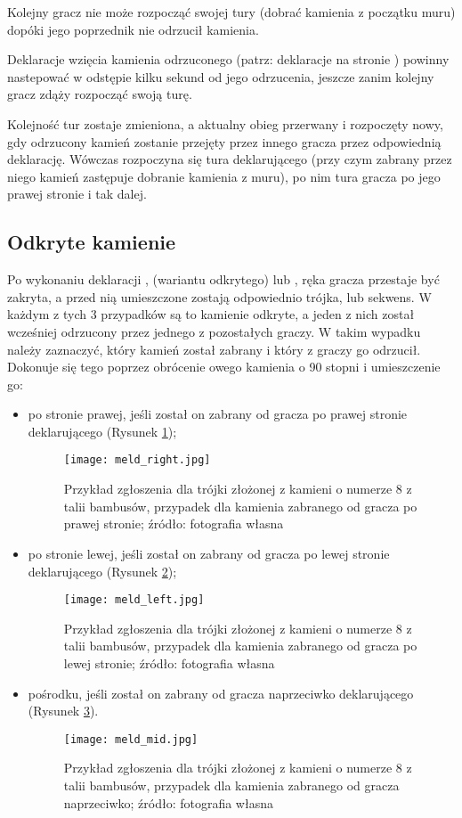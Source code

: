 Kolejny gracz nie może rozpocząć swojej tury (dobrać kamienia z początku muru)
dopóki jego poprzednik nie odrzucił kamienia. 

Deklaracje wzięcia kamienia odrzuconego (patrz: deklaracje na stronie
\pageref{deklaracje}) powinny nastepować w odstępie kilku sekund od jego
odrzucenia, jeszcze zanim kolejny gracz zdąży rozpocząć swoją turę.

Kolejność tur zostaje zmieniona, a aktualny obieg przerwany i rozpoczęty nowy,
gdy odrzucony kamień zostanie przejęty przez innego gracza przez odpowiednią deklarację.
Wówczas rozpoczyna się tura deklarującego (przy czym zabrany przez niego kamień
zastępuje dobranie kamienia z muru), po nim tura gracza po jego prawej stronie i
tak dalej.

\subsection{Odkryte kamienie}
Po wykonaniu deklaracji ,  (wariantu odkrytego) lub
, ręka gracza przestaje być zakryta, a przed nią
umieszczone zostają  odpowiednio trójka,  lub sekwens. W każdym z
tych 3 przypadków są to kamienie odkryte, a jeden z nich został wcześniej
odrzucony przez jednego z pozostałych graczy. W takim wypadku należy zaznaczyć,
który kamień został zabrany i który z graczy go odrzucił. Dokonuje się tego
poprzez obrócenie owego kamienia o 90 stopni i umieszczenie go:
\begin{itemize}
  \item po stronie prawej, jeśli został on zabrany od gracza po prawej stronie
  deklarującego (Rysunek \ref{fig:meldright});
  \begin{figure}[H]
  \centering
  \texttt{[image: meld\_right.jpg]}
  \caption{Przykład zgłoszenia  dla trójki złożonej z kamieni o
  numerze 8 z talii bambusów, przypadek dla kamienia zabranego od gracza po
  prawej stronie; źródło:
  fotografia własna}
  \label{fig:meldright}
  \end{figure}
  \item po stronie lewej, jeśli został on zabrany od gracza po lewej stronie
  deklarującego (Rysunek \ref{fig:meldleft});
  \begin{figure}[H]
  \centering
  \texttt{[image: meld\_left.jpg]}
  \caption{Przykład zgłoszenia  dla trójki złożonej z kamieni o
  numerze 8 z talii bambusów, przypadek dla kamienia zabranego od gracza po
  lewej stronie; źródło: fotografia własna}
  \label{fig:meldleft}
  \end{figure}
  \item pośrodku, jeśli został on zabrany od gracza naprzeciwko deklarującego
  (Rysunek \ref{fig:meldmid}).
  \begin{figure}[H]
  \centering
  \texttt{[image: meld\_mid.jpg]}
  \caption{Przykład zgłoszenia  dla trójki złożonej z kamieni o
  numerze 8 z talii bambusów, przypadek dla kamienia zabranego od gracza
  naprzeciwko; źródło: fotografia własna}
  \label{fig:meldmid}
  \end{figure}
\end{itemize}
